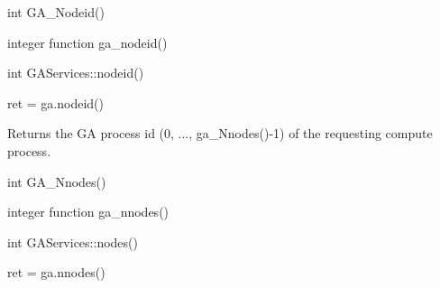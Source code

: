 \documentclass[10pt]{article}
\begin{document}

\begin{capi}
\begin{ccode}
int GA_Nodeid()
\end{ccode}
\end{capi}

\begin{fapi}
\begin{fcode}
integer function ga_nodeid()
\end{fcode}
\end{fapi}

\begin{cxxapi}
\begin{cxxcode}
int GAServices::nodeid()
\end{cxxcode}
\end{cxxapi}

\begin{pyapi}
\begin{pycode}
ret = ga.nodeid()
\end{pycode}
\end{pyapi}

\local

\begin{desc}

Returns the GA process id (0, ..., ga_Nnodes()-1) of the requesting compute
process.

\end{desc}


\begin{capi}
\begin{ccode}
int GA_Nnodes()
\end{ccode}
\end{capi}

\begin{fapi}
\begin{fcode}
integer function ga_nnodes()
\end{fcode}
\end{fapi}

\begin{cxxapi}
\begin{cxxcode}
int GAServices::nodes()
\end{cxxcode}
\end{cxxapi}

\begin{pyapi}
\begin{pycode}
ret = ga.nnodes()
\end{pycode}
\end{pyapi}
\end{document}
